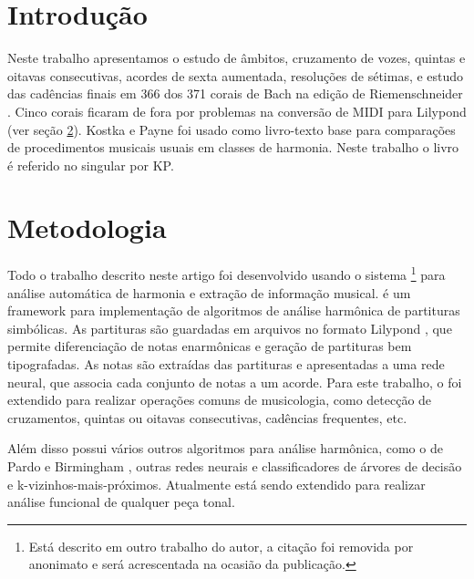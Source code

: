 \section{Introdução}
\label{sec:introducao}


Neste trabalho apresentamos o estudo de âmbitos, cruzamento de vozes,
quintas e oitavas consecutivas, acordes de sexta aumentada, resoluções
de sétimas, e estudo das cadências finais em 366 dos 371 corais de
Bach na edição de Riemenschneider \cite{bach41:371}. Cinco corais
ficaram de fora por problemas na conversão de MIDI para Lilypond (ver
seção \ref{sec:metodologia}).  Kostka e Payne \cite{kostka.ea00:tonal}
foi usado como livro-texto base para comparações de procedimentos
musicais usuais em classes de harmonia. Neste trabalho o livro é
referido no singular por KP.

\section{Metodologia}
\label{sec:metodologia}

Todo o trabalho descrito neste artigo foi desenvolvido usando o
sistema \rameau{}\footnote{Está descrito em outro trabalho do autor, a
  citação foi removida por anonimato e será acrescentada na ocasião da
  publicação.} para análise automática de harmonia e extração de
informação musical. \rameau{} é um framework para implementação de
algoritmos de análise harmônica de partituras simbólicas. As
partituras são guardadas em arquivos no formato Lilypond
\cite{nienhuys.ea08:lilypond}, que permite diferenciação de notas
enarmônicas e geração de partituras bem tipografadas. As notas são
extraídas das partituras e apresentadas a uma rede neural, que associa
cada conjunto de notas a um acorde.  Para este trabalho, o \rameau{} foi
extendido para realizar operações comuns de musicologia, como detecção
de cruzamentos, quintas ou oitavas consecutivas, cadências frequentes,
etc.

Além disso \rameau{}  possui vários outros algoritmos para análise
harmônica, como o de  Pardo e Birmingham \cite{pardo.ea00:automated},
outras redes neurais e classificadores de árvores de decisão e
k-vizinhos-mais-próximos. Atualmente \rameau{}  está sendo extendido para
realizar análise funcional de qualquer peça tonal.

